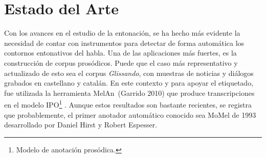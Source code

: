 \begin{comment}

- En github hay un proyecto de septiembre de 2019 que es un anotador automatico escrito en Python complementado con Praat(hay que descargarse Praat) para el modelo ToBi

- Proyecto glissando: Grabacion de corpus prosodico de noticias y dialogos en espanol

-parece q es importante la construccion de corpus prosodicos

- Glissando es un corpus prosodico 
	- los audios tienen cada uno varias caracteristicas entre ellos su etiqueta de entonacion en forma de transcripcion Tobi y para he ello se ha notado muchisimo lo util de tener un anotador automatico con Tobi
	- Una parte del corpus la anotaron con MelAn, un anotador automatico que produce transcripciones en el modelo IPO
	- tambien hicieron la particion del habla continua por segmentos(en silabas, frases mayores y menores). Las mayores 
	son las q se acaban con un silencio o una pausa (?breath-groups?). Las menores(frases intermedias) determinan un contorno de F0 completo, que los oyentes perciben como terminal.
	- SegProso fue la herramienta que usaron para picar por frases ( GLiCom group at Pompeu Fabra University)
	- MelAn (Garrido 2010)
	
	
	- Aunque por cada segmento de audio recoge varias caracter\'isticas como la transcripci\'on ortogr\'afica, archiva informaci\'on sobre el contorno entonativo codificado al estilo del modelo ToBI, el cual ser\'a referido m\'as adelante.
	
	
MoMel: posiblemente el primer anotador automatico que ha existido creo que es de INSINT
\end{comment}


\section{Estado del Arte}
Con los avances en el estudio de la entonaci\'on, se ha hecho m\'as evidente la necesidad de contar con instrumentos para detectar de forma autom\'atica los contornos entonativos del habla. Una de las aplicaciones m\'as fuertes, es la construcci\'on de corpus pros\'odicos. Puede que el caso m\'as representativo y actualizado de esto sea el corpus \emph{Glissando}, con muestras de noticias y di\'alogos grabados en castellano y catal\'an.  En este contexto y para apoyar el etiquetado, fue utilizada la herramienta MelAn~(Garrido 2010) que produce transcripciones en el modelo IPO\footnote{Modelo de anotaci\'on pros\'odica.} \cite{garrido2013glissando, alminana2018using}. Aunque estos resultados son bastante recientes, se registra que probablemente, el primer anotador autom\'atico conocido sea MoMel de 1993 desarrollado por Daniel Hirst y Robert Espesser. 


